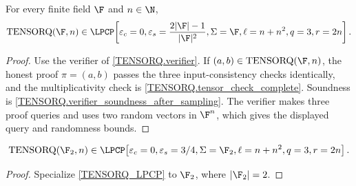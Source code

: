 \begin{theorem}\label{TENSORQ_LPCP}\leanok
For every finite field \(\F\) and \(n \in \N\),
\[
  \mathrm{TENSORQ}(\F, n) \in
  \LPCP\!\left[
    \varepsilon_c = 0,
    \varepsilon_s = \frac{2|\F|-1}{|\F|^2},
    \Sigma = \F,
    \ell = n + n^2,
    q = 3,
    r = 2n
  \right].
\]
\end{theorem}
\begin{proof}\leanok
Use the verifier of \ref{TENSORQ.verifier}. If
\((a,b)\in\mathrm{TENSORQ}(\F,n)\), the honest proof \(\pi=(a,b)\) passes the
three input-consistency checks identically, and the multiplicativity check is
\ref{TENSORQ.tensor_check_complete}. Soundness is
\ref{TENSORQ.verifier_soundness_after_sampling}. The verifier makes three proof
queries and uses two random vectors in \(\F^n\), which gives the displayed query
and randomness bounds.
\end{proof}

\begin{corollary}\label{TENSORQ_LPCP_Zmod2}\leanok
\[
  \mathrm{TENSORQ}(\F_2, n) \in
  \LPCP\!\left[
    \varepsilon_c = 0,
    \varepsilon_s = 3 / 4,
    \Sigma = \F_2,
    \ell = n + n^2,
    q = 3,
    r = 2 n
  \right].
\]
\end{corollary}
\begin{proof}\leanok
Specialize \ref{TENSORQ_LPCP} to \(\F_2\), where \(|\F_2|=2\).
\end{proof}


